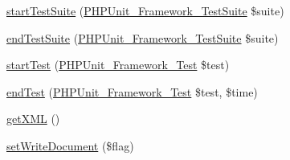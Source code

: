 \begin{DoxyCompactItemize}
\mbox{\hyperlink{class_p_h_p_unit___util___log___j_unit_a901a86a623d83184267b21f2daee0ff5}{start\+Test\+Suite}} (\mbox{\hyperlink{class_p_h_p_unit___framework___test_suite}{P\+H\+P\+Unit\+\_\+\+Framework\+\_\+\+Test\+Suite}} \$suite)
\item 
\mbox{\hyperlink{class_p_h_p_unit___util___log___j_unit_aeec28a4d1328434916ebcdc1ca6b5527}{end\+Test\+Suite}} (\mbox{\hyperlink{class_p_h_p_unit___framework___test_suite}{P\+H\+P\+Unit\+\_\+\+Framework\+\_\+\+Test\+Suite}} \$suite)
\item 
\mbox{\hyperlink{class_p_h_p_unit___util___log___j_unit_a1a9bddc54f26bb3fb5c2ec9778ea5198}{start\+Test}} (\mbox{\hyperlink{interface_p_h_p_unit___framework___test}{P\+H\+P\+Unit\+\_\+\+Framework\+\_\+\+Test}} \$test)
\item 
\mbox{\hyperlink{class_p_h_p_unit___util___log___j_unit_a6de65eea8b294795cbc34c4c8cee8546}{end\+Test}} (\mbox{\hyperlink{interface_p_h_p_unit___framework___test}{P\+H\+P\+Unit\+\_\+\+Framework\+\_\+\+Test}} \$test, \$time)
\item 
\mbox{\hyperlink{class_p_h_p_unit___util___log___j_unit_af18f946b8766fa1799890dfd500004fc}{get\+X\+ML}} ()
\item 
\mbox{\hyperlink{class_p_h_p_unit___util___log___j_unit_a0d177b0430978fd7abd8a067b6f612a7}{set\+Write\+Document}} (\$flag)
\end{DoxyCompactItemize}
